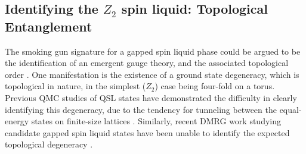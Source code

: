 \documentclass[range]{ar2e}
\begin{document}
\subsection{Identifying the $Z_2$ spin liquid: Topological Entanglement} 
\label{topoEEsec}

The smoking gun signature for a gapped spin liquid phase could be argued to be the identification of an emergent gauge theory,
and the associated topological order \cite{Wenbook}.  One manifestation is the existence of a ground state degeneracy, which is topological in nature, in the simplest ($Z_2$) case being four-fold on a torus.  Previous QMC studies of QSL states have demonstrated the difficulty in clearly identifying this degeneracy, due to the tendency for tunneling between the equal-energy states on finite-size lattices \cite{Isakov1}.  Similarly, recent DMRG work studying candidate gapped spin liquid states have been unable to identify the expected topological degeneracy \cite{Yan,J1J2}.
\end{document}
